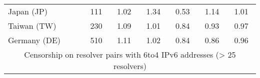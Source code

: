 \begin{table}[h!]
{\begin{tabular}{lcccccc}
Japan (JP) & \color{black} 111 & {\cellcolor[HTML]{B5D4E9}} \color[HTML]{000000} \color{black} 1.02 & {\cellcolor[HTML]{6AAED6}} \color[HTML]{F1F1F1} \color{black} 1.34 & {\cellcolor[HTML]{F7FBFF}} \color[HTML]{000000} \color{black} 0.53 & {\cellcolor[HTML]{9FCAE1}} \color[HTML]{000000} \color{black} 1.14 & \color{black} 1.01 \\
Taiwan (TW) & \color{black} 230 & {\cellcolor[HTML]{6AAED6}} \color[HTML]{F1F1F1} \color{black} 1.09 & {\cellcolor[HTML]{ABD0E6}} \color[HTML]{000000} \color{black} 1.01 & {\cellcolor[HTML]{F7FBFF}} \color[HTML]{000000} \color{black} 0.84 & {\cellcolor[HTML]{D3E4F3}} \color[HTML]{000000} \color{black} 0.93 & \color{black} 0.97 \\
Germany (DE) & \color{black} 510 & {\cellcolor[HTML]{6AAED6}} \color[HTML]{F1F1F1} \color{black} 1.11 & {\cellcolor[HTML]{A9CFE5}} \color[HTML]{000000} \color{black} 1.02 & {\cellcolor[HTML]{F7FBFF}} \color[HTML]{000000} \color{black} 0.84 & {\cellcolor[HTML]{F0F6FD}} \color[HTML]{000000} \color{black} 0.86 & \color{black} 0.96 \\

    \midrule
    \multicolumn{7}{c}{Censorship on resolver pairs with 6to4 IPv6 addresses
    (> 25 resolvers)}\\
    \midrule


\end{tabular}}
\end{table}
